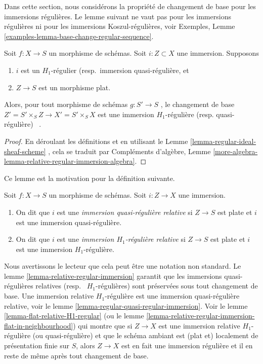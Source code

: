 \noindent
Dans cette section, nous considérons la propriété de changement de base pour les
immersions régulières. Le lemme suivant ne vaut pas pour les immersions
régulières ni pour les immersions Koszul-régulières, voir Exemples, Lemme  \ref{examples-lemma-base-change-regular-sequence}.

\begin{lemma}
\label{lemma-relative-regular-immersion}
Soit  $f : X \to S$  un morphisme de schémas. Soit  $i : Z \subset X$  une immersion.
Supposons
\begin{enumerate}
\item $i$  est un  $H_1$-régulier (resp.\ immersion
quasi-régulière, et
\item $Z \to S$  est un morphisme plat.
\end{enumerate}
Alors, pour tout morphisme de schémas  $g : S' \to S$ , le changement de base
 $Z' = S' \times_S Z \to X' = S' \times_S X$  est une immersion  $H_1$-régulière (resp. quasi-régulière)
\ .
\end{lemma}

\begin{proof}
En déroulant les définitions et en utilisant le Lemme  \ref{lemma-regular-ideal-sheaf-scheme} , cela se
traduit par Compléments d'algèbre, Lemme  \ref{more-algebra-lemma-relative-regular-immersion-algebra}.
\end{proof}

\noindent
Ce lemme est la motivation pour la définition suivante.

\begin{definition}
\label{definition-relative-H1-regular-immersion}
Soit  $f : X \to S$  un morphisme de schémas. Soit  $i : Z \to X$  une immersion.
\begin{enumerate}
\item On dit que  $i$  est une  {\it  immersion quasi-régulière
relative }  si  $Z \to S$  est plate et  $i$  est une immersion
quasi-régulière.
\item On dit que  $i$  est une  {\it  immersion
 $H_1$-régulière relative }  si  $Z \to S$  est plate et
 $i$  est une immersion  $H_1$-régulière.
\end{enumerate}
\end{definition}

\noindent
Nous avertissons le lecteur que cela peut être une notation non standard. Le lemme
 \ref{lemma-relative-regular-immersion}  garantit que les immersions quasi-régulières relatives (resp.
\ $H_1$-régulières) sont préservées sous tout changement de base.
Une immersion relative  $H_1$-régulière est une immersion quasi-régulière
relative, voir le lemme  \ref{lemma-regular-quasi-regular-immersion}. Voir le lemme  \ref{lemma-flat-relative-H1-regular}  (ou
le lemme  \ref{lemma-relative-regular-immersion-flat-in-neighbourhood}) qui montre que si  $Z \to X$  est une immersion relative
 $H_1$-régulière (ou quasi-régulière) et que le schéma ambiant est (plat et)
localement de présentation finie sur  $S$, alors  $Z \to X$  est en fait
une immersion régulière et il en reste de même après tout changement de base.

